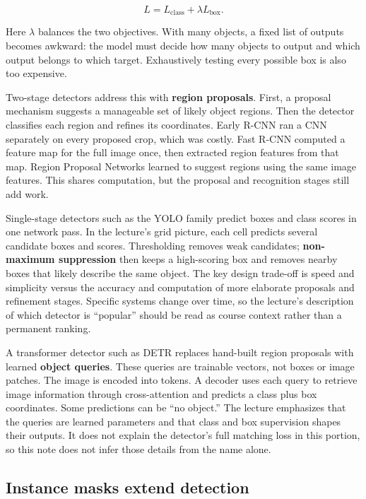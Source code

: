 \[
L=L_{\text{class}}+\lambda L_{\text{box}}.
\]

Here \(\lambda\) balances the two objectives. With many objects, a fixed list of outputs becomes awkward: the model must decide how many objects to output and which output belongs to which target. Exhaustively testing every possible box is also too expensive.

Two-stage detectors address this with \textbf{region proposals}. First, a proposal mechanism suggests a manageable set of likely object regions. Then the detector classifies each region and refines its coordinates. Early R-CNN ran a CNN separately on every proposed crop, which was costly. Fast R-CNN computed a feature map for the full image once, then extracted region features from that map. Region Proposal Networks learned to suggest regions using the same image features. This shares computation, but the proposal and recognition stages still add work.

Single-stage detectors such as the YOLO family predict boxes and class scores in one network pass. In the lecture's grid picture, each cell predicts several candidate boxes and scores. Thresholding removes weak candidates; \textbf{non-maximum suppression} then keeps a high-scoring box and removes nearby boxes that likely describe the same object. The key design trade-off is speed and simplicity versus the accuracy and computation of more elaborate proposals and refinement stages. Specific systems change over time, so the lecture's description of which detector is ``popular'' should be read as course context rather than a permanent ranking.

A transformer detector such as DETR replaces hand-built region proposals with learned \textbf{object queries}. These queries are trainable vectors, not boxes or image patches. The image is encoded into tokens. A decoder uses each query to retrieve image information through cross-attention and predicts a class plus box coordinates. Some predictions can be ``no object.'' The lecture emphasizes that the queries are learned parameters and that class and box supervision shapes their outputs. It does not explain the detector's full matching loss in this portion, so this note does not infer those details from the name alone.

\subsection{Instance masks extend detection}\label{04-visual-computing-ii-ch031-instance-masks-extend-detection}

